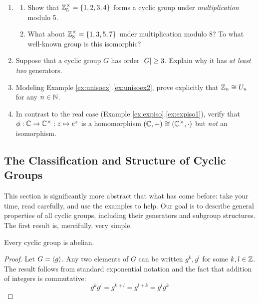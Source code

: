 \begin{exercises}
\begin{enumerate}
		  
	  \item\label{exs:z5times2}
	  \begin{enumerate}
	    \item Show that $\mathbb{Z}_5^\times=\{1,2,3,4\}$ forms a cyclic group under \emph{multiplication} modulo 5.
	  	\item What about $\mathbb{Z}_8^\times=\{1,3,5,7\}$ under multiplication modulo 8? To what well-known group is this isomorphic?
	  \end{enumerate}
	  
	  
	  \item Suppose that a cyclic group $G$ has order $\left| G\right|\ge 3$. Explain why it has \emph{at least two} generators.
	
		
		\item Modeling Example \ref*{ex:unisoex}.\ref{ex:unisoex2}, prove explicitly that $\mathbb{Z}_n\cong U_n$ for any $n\in\mathbb{N}$.
		
	  
	  \item In contrast to the real case (Example \ref*{ex:expiso}.\ref{ex:expiso1}), verify that $\phi:\mathbb{C}\to\mathbb{C}^\times:z\mapsto e^z$ is a homomorphism $(\mathbb{C},+)\cong(\mathbb{C}^\times,\cdot)$ but \emph{not} an isomorphism.
	 
	\end{enumerate}
\end{exercises}

\clearpage



\subsection{The Classification and Structure of Cyclic Groups}\label{sec:cyclicclass}

This section is significantly more abstract that what has come before: take your time, read carefully, and use the examples to help. Our goal is to describe general properties of all cyclic groups, including  their generators and subgroup structures. The first result is, mercifully, very simple.

\begin{lemm}{}{}
	Every cyclic group is abelian.
\end{lemm}

\begin{proof}
	Let $G=\left\langle g\right\rangle$. Any two elements of $G$ can be written $g^k,g^l$ for some $k,l\in\mathbb{Z}$. The result follows from standard exponential notation and the fact that addition of integers is commutative:
	\[
		g^kg^l=g^{k+l}=g^{l+k}=g^lg^k\tag*{\qedhere}
	\]
\end{proof}

